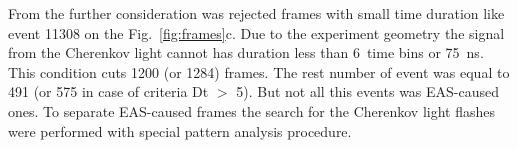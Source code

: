 \documentclass[final,5p,times,twocolumn]{elsarticle}
\begin{document}
From the further consideration was rejected frames with small time duration like event 11308 on the Fig.~\ref{fig:frames}c. Due to the experiment geometry the signal from the Cherenkov light cannot has duration less than 6~time bins or 75~ns. This condition cuts 1200 (or 1284) frames. 
The rest number of event was equal to 491 (or 575 in case of criteria Dt $>$ 5). But not all this events was EAS-caused ones. To separate EAS-caused frames the search for the Cherenkov light flashes were performed with special pattern analysis procedure. %





\end{document}
